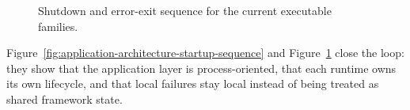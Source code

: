 \begin{figure}[htbp]
\centering
\caption{Shutdown and error-exit sequence for the current executable families.}
\label{fig:application-architecture-shutdown-sequence}
\end{figure}

Figure~\ref{fig:application-architecture-startup-sequence} and
Figure~\ref{fig:application-architecture-shutdown-sequence} close the loop:
they show that the application layer is process-oriented, that each runtime
owns its own lifecycle, and that local failures stay local instead of being
treated as shared framework state.
